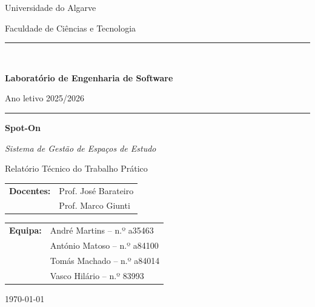 \documentclass[11pt,a4paper]{article}
\begin{document}
\begin{titlepage}
    \centering
    \vspace*{1.5cm}

    {\large Universidade do Algarve \par}
    {\normalsize Faculdade de Ciências e Tecnologia \par}

    \vspace{1cm}
    \rule{\linewidth}{0.4pt}\\[0.4em]
    {\Large\bfseries Laboratório de Engenharia de Software \par}
    {\normalsize Ano letivo 2025/2026 \par}
    \rule{\linewidth}{0.4pt}

    \vspace{3cm}

    {\Huge\bfseries Spot-On \par}
    \vspace{0.6cm}
    {\Large\itshape Sistema de Gestão de Espaços de Estudo \par}

    \vspace{2.5cm}

    {\large Relatório Técnico do Trabalho Prático \par}

    \vspace{2cm}

    \begin{tabular}{rl}
        \textbf{Docentes:} & Prof. José Barateiro \\
                           & Prof. Marco Giunti   \\
    \end{tabular}

    \vspace{1.5cm}

    \begin{tabular}{rl}
        \textbf{Equipa:} & André Martins -- n.º a35463  \\
                         & António Matoso -- n.º a84100 \\
                         & Tomás Machado -- n.º a84014  \\
                         & Vasco Hilário -- n.º 83993   \\
    \end{tabular}

    \vfill
    {\large \today \par}
\end{titlepage}
\end{document}
